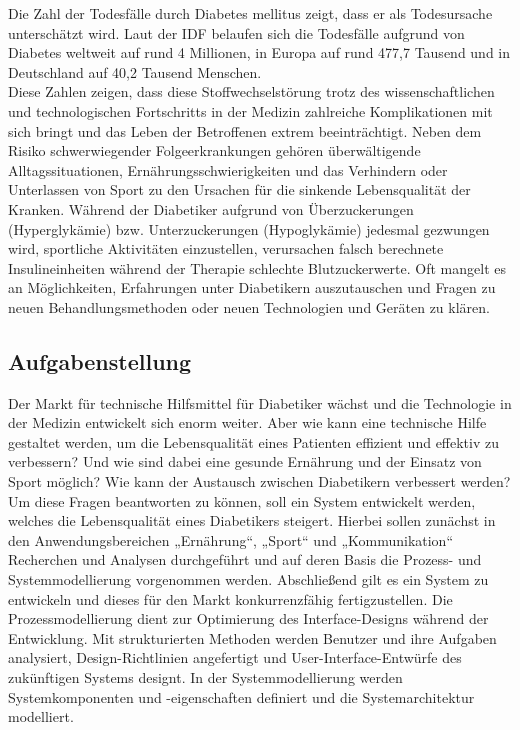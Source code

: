 	Die Zahl der Todesfälle durch Diabetes mellitus zeigt, dass er als Todesursache unterschätzt wird. Laut der IDF belaufen sich die Todesfälle aufgrund von Diabetes weltweit auf rund 4 Millionen, in Europa auf rund 477,7 Tausend und in Deutschland auf 40,2 Tausend Menschen.\cite[S. 46]{IDF}\\
	Diese Zahlen zeigen, dass diese Stoffwechselstörung trotz des wissenschaftlichen und technologischen Fortschritts in der Medizin zahlreiche Komplikationen mit sich bringt und das Leben der Betroffenen extrem beeinträchtigt. Neben dem Risiko schwerwiegender Folgeerkrankungen gehören überwältigende Alltagssituationen, Ernährungsschwierigkeiten und das Verhindern oder Unterlassen von Sport zu den Ursachen für die sinkende Lebensqualität der Kranken. \newline
	Während der Diabetiker aufgrund von Überzuckerungen (Hyperglykämie) bzw. Unterzuckerungen (Hypoglykämie) jedesmal gezwungen wird, sportliche Aktivitäten einzustellen, verursachen falsch berechnete Insulineinheiten während der Therapie schlechte Blutzuckerwerte. Oft mangelt es an Möglichkeiten, Erfahrungen unter Diabetikern auszutauschen und Fragen zu neuen Behandlungsmethoden oder neuen Technologien und Geräten zu klären.
\subsection{Aufgabenstellung}
	Der Markt für technische Hilfsmittel für Diabetiker wächst und die Technologie in der Medizin entwickelt sich enorm weiter. Aber wie kann eine technische Hilfe gestaltet werden, um die Lebensqualität eines Patienten effizient und effektiv zu verbessern? Und wie sind dabei eine gesunde Ernährung und der Einsatz von Sport möglich? Wie kann der Austausch zwischen Diabetikern verbessert werden?\\
	Um diese Fragen beantworten zu können, soll ein System entwickelt werden, welches die Lebensqualität eines Diabetikers steigert. Hierbei sollen zunächst in den Anwendungsbereichen „Ernährung“, „Sport“ und „Kommunikation“ Recherchen und Analysen durchgeführt und auf deren Basis die Prozess- und Systemmodellierung vorgenommen werden. Abschließend gilt es ein System zu  entwickeln und dieses für den Markt konkurrenzfähig fertigzustellen. \newline
	Die Prozessmodellierung dient zur Optimierung des Interface-Designs während der Entwicklung. Mit strukturierten Methoden werden Benutzer und ihre Aufgaben analysiert, Design-Richtlinien angefertigt und User-Interface-Entwürfe des zukünftigen Systems designt. 
	In der Systemmodellierung werden Systemkomponenten und -eigenschaften definiert und die Systemarchitektur modelliert.

